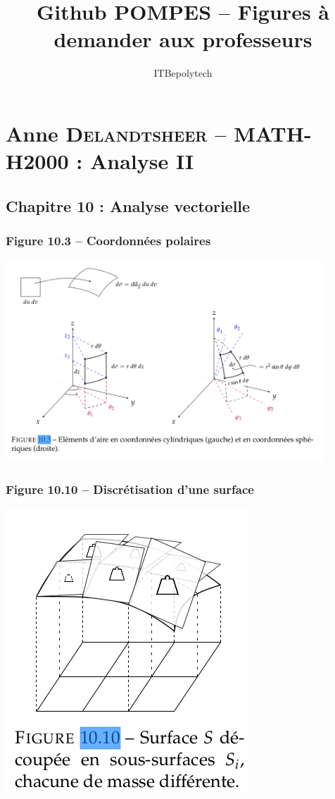 \documentclass[12pt, a4paper]{article}
\title{Github POMPES -- Figures à demander aux professeurs}
\author{ITBepolytech}
\begin{document}
\maketitle
\section{Anne \textsc{Delandtsheer} -- MATH-H2000 : Analyse II}
\subsection{Chapitre 10 : Analyse vectorielle}
\subsubsection{Figure 10.3 -- Coordonnées polaires}
\begin{center}
\includegraphics[width=0.9\textwidth]{images/MATH-H2000_10_3}
\end{center}
\subsubsection{Figure 10.10 -- Discrétisation d'une surface}
\begin{center}
\includegraphics[scale=0.4]{images/MATH-H2000_10_10}
\end{center}
\end{document}
